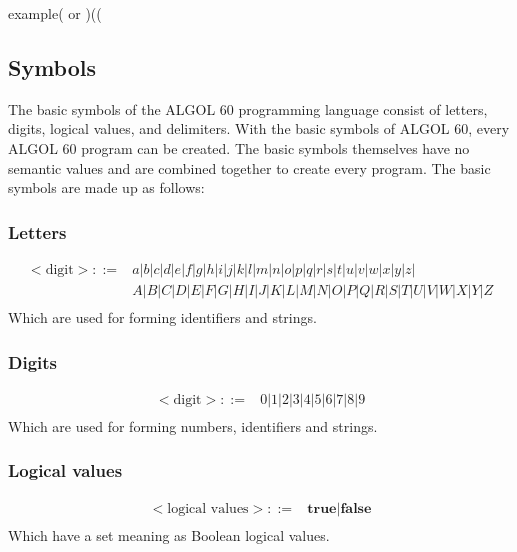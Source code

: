\documentclass{article}
\begin{document}
example( or )((

\subsection{Symbols}
The basic symbols of the ALGOL 60 programming language consist of letters, digits, logical values, and delimiters. With the basic symbols of ALGOL 60, every ALGOL 60 program can be created. The basic symbols themselves have no semantic values and are combined together to create every program. The basic symbols are made up as follows: \\

\subsubsection{Letters}
\begin{equation} \label{eq2}
\begin{split}
<\text{digit}> ::=&a|b|c|d|e|f|g|h|i|j|k|l|m|n|o|p|q|r|s|t|u|v|w|x|y|z|\\&A|B|C|D|E|F|G|H|I|J|K|L|M|N|O|P|Q|R|S|T|U|V|W|X|Y|Z \\
\end{split}
\end{equation}
Which are used for forming identifiers and strings.

\subsubsection{Digits}
\begin{equation} \label{eq3}
\begin{split}
<\text{digit}> ::=&0|1|2|3|4|5|6|7|8|9 \\
\end{split}
\end{equation}
Which are used for forming numbers, identifiers and strings.

\subsubsection{Logical values}
\begin{equation} \label{eq4}
\begin{split}
<\text{logical values}> ::=&\textbf{true}|\textbf{false} \\
\end{split}
\end{equation}
Which have a set meaning as Boolean logical values.
\end{document}
